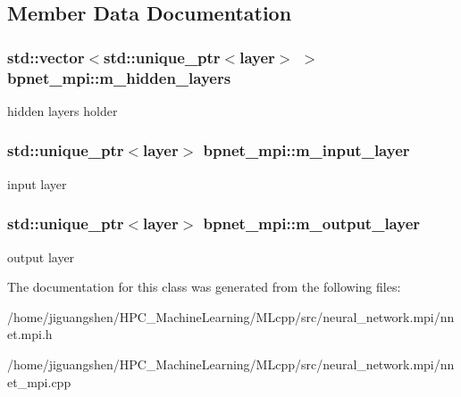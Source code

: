 \subsection{Member Data Documentation}
\hypertarget{classbpnet__mpi_a590981e3b36b8c076fea1206a3d520ef}{
\subsubsection[{m\-\_\-hidden\-\_\-layers}]{\setlength{\rightskip}{0pt plus 5cm}std\-::vector$<$std\-::unique\-\_\-ptr$<${\bf layer}$>$ $>$ bpnet\-\_\-mpi\-::m\-\_\-hidden\-\_\-layers\hspace{0.3cm}{\ttfamily [protected]}}}\label{classbpnet__mpi_a590981e3b36b8c076fea1206a3d520ef}
hidden layers holder \hypertarget{classbpnet__mpi_a0aa75e3e05f2506f42772dde626749f9}{
\subsubsection[{m\-\_\-input\-\_\-layer}]{\setlength{\rightskip}{0pt plus 5cm}std\-::unique\-\_\-ptr$<${\bf layer}$>$ bpnet\-\_\-mpi\-::m\-\_\-input\-\_\-layer\hspace{0.3cm}{\ttfamily [protected]}}}\label{classbpnet__mpi_a0aa75e3e05f2506f42772dde626749f9}
input layer \hypertarget{classbpnet__mpi_ad734a9a35fb6f3deeccf4bc94a9c1ca4}{
\subsubsection[{m\-\_\-output\-\_\-layer}]{\setlength{\rightskip}{0pt plus 5cm}std\-::unique\-\_\-ptr$<${\bf layer}$>$ bpnet\-\_\-mpi\-::m\-\_\-output\-\_\-layer\hspace{0.3cm}{\ttfamily [protected]}}}\label{classbpnet__mpi_ad734a9a35fb6f3deeccf4bc94a9c1ca4}
output layer 

The documentation for this class was generated from the following files\-:\begin{DoxyCompactItemize}
\item 
/home/jiguangshen/\-H\-P\-C\-\_\-\-Machine\-Learning/\-M\-Lcpp/src/neural\-\_\-network.\-mpi/nnet.\-mpi.\-h\item 
/home/jiguangshen/\-H\-P\-C\-\_\-\-Machine\-Learning/\-M\-Lcpp/src/neural\-\_\-network.\-mpi/nnet\-\_\-mpi.\-cpp\end{DoxyCompactItemize}
